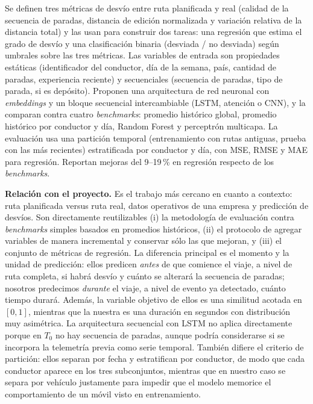 \documentclass[12pt, a4paper]{article}
\begin{document}
Se definen tres métricas de desvío entre ruta planificada y real (calidad de la
secuencia de paradas, distancia de edición normalizada y variación relativa de
la distancia total) y las usan para construir dos tareas: una regresión que
estima el grado de desvío y una clasificación binaria (desviada / no desviada)
según umbrales sobre las tres métricas. Las variables de entrada son
propiedades estáticas (identificador del conductor, día de la semana, país,
cantidad de paradas, experiencia reciente) y secuenciales (secuencia de
paradas, tipo de parada, si es depósito). Proponen una arquitectura de red
neuronal con \emph{embeddings} y un bloque secuencial intercambiable (LSTM,
atención o CNN), y la comparan contra cuatro \emph{benchmarks}: promedio
histórico global, promedio histórico por conductor y día, Random Forest y
perceptrón multicapa. La evaluación usa una partición temporal
(entrenamiento con rutas antiguas, prueba con las más recientes) estratificada
por conductor y día, con MSE, RMSE y MAE para regresión. Reportan mejoras del
9--19\,\% en regresión respecto de los \emph{benchmarks}.

\textbf{Relación con el proyecto.} Es el trabajo más cercano en cuanto a
contexto: ruta planificada versus ruta real, datos operativos de una empresa
y predicción de desvíos. Son directamente reutilizables (i) la metodología de
evaluación contra \emph{benchmarks} simples basados en
promedios históricos, (ii) el protocolo de agregar variables de manera
incremental y conservar sólo las que mejoran, y (iii) el conjunto de métricas
de regresión. La diferencia principal es el momento y la unidad de predicción:
ellos predicen \emph{antes} de que comience el viaje, a nivel de ruta completa,
si habrá desvío y cuánto se alterará la secuencia de paradas; nosotros
predecimos \emph{durante} el viaje, a nivel de evento ya detectado, cuánto
tiempo durará. Además, la variable objetivo de ellos es una similitud
acotada en $[0,1]$, mientras que la nuestra es una duración en segundos con
distribución muy asimétrica. La arquitectura secuencial con LSTM no aplica
directamente porque en $T_0$ no hay secuencia de paradas, aunque podría
considerarse si se incorpora la telemetría previa como serie temporal. También
difiere el criterio de partición: ellos separan por fecha y estratifican por
conductor, de modo que cada conductor aparece en los tres subconjuntos,
mientras que en nuestro caso se separa por vehículo justamente para impedir que
el modelo memorice el comportamiento de un móvil visto en entrenamiento.
\end{document}
